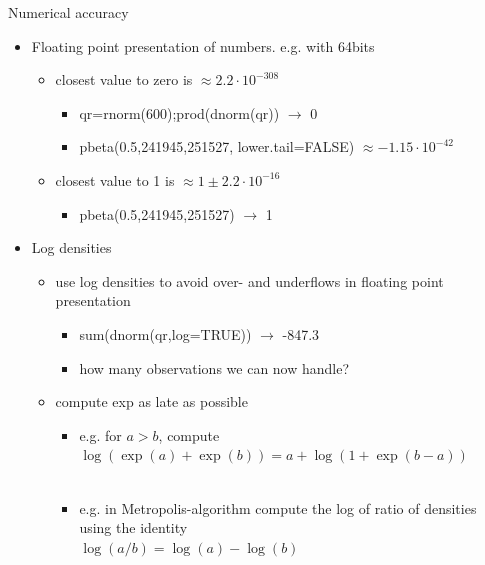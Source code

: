 \documentclass[finnish,english,t]{beamer}
\begin{document}
\begin{frame}
  
  {\Large\color{navyblue} Numerical accuracy}

  \begin{itemize}
  \item Floating point presentation of numbers. e.g. with 64bits
    \begin{itemize}
    \item closest value to zero is $\approx 2.2\cdot 10^{-308}$
      \begin{itemize}
      \item qr=rnorm(600);prod(dnorm(qr)) $\rightarrow$ 0
      \item<3-> pbeta(0.5,241945,251527, lower.tail=FALSE) $\approx -1.15\cdot 10^{-42}$
      \end{itemize}
    \item<2-> closest value to 1 is $\approx 1 \pm  2.2\cdot 10^{-16}$
      \begin{itemize}
      \item pbeta(0.5,241945,251527) $\rightarrow$ 1
      \end{itemize}
    \end{itemize}
  \item<4-> Log densities
    \begin{itemize}
    \item use log densities to avoid over- and underflows in floating
      point presentation
      \begin{itemize}
      \item sum(dnorm(qr,log=TRUE)) $\rightarrow$ -847.3
      \item<5-> how many observations we can now handle? %
    \end{itemize}
    \item<6-> compute exp as late as possible
      \begin{itemize}
      \item<7-> e.g. for $a>b$, compute $\log(\exp(a)+\exp(b)) = a + \log(1+\exp(b-a))$\\
        \\
      \item<10-> e.g. in Metropolis-algorithm compute the log of ratio of densities using the identity\\
        $\log(a/b)=\log(a)-\log(b)$
    \end{itemize}
    \end{itemize}
  \end{itemize}

\end{frame}
\end{document}
